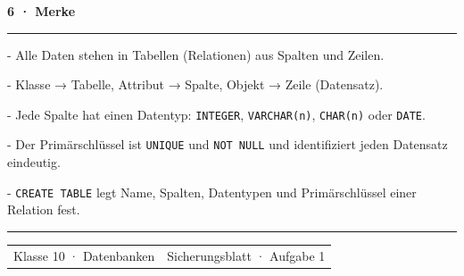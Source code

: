 \documentclass[10pt,a4paper]{article}
\newcommand{\sectiontitle}[1]{%
  \vspace{2.3mm}
  {\color{Blue}\bfseries\large #1}\par
  \vspace{0.8mm}
  {\color{Blue}\rule{\linewidth}{0.7pt}}\par
  \vspace{1.2mm}
}
\begin{document}
\sectiontitle{6 · Merke}

\begin{tcolorbox}[colback=white,colframe=Line,arc=3mm,boxrule=0.7pt,left=3mm,right=3mm,top=2mm,bottom=2mm]
  - Alle Daten stehen in Tabellen (Relationen) aus Spalten und Zeilen.\par
  - Klasse → Tabelle, Attribut → Spalte, Objekt → Zeile (Datensatz).\par
  - Jede Spalte hat einen Datentyp: \texttt{INTEGER}, \texttt{VARCHAR(n)},
  \texttt{CHAR(n)} oder \texttt{DATE}.\par
  - Der Primärschlüssel ist \texttt{UNIQUE} und \texttt{NOT NULL} und
  identifiziert jeden Datensatz eindeutig.\par
  - \texttt{CREATE TABLE} legt Name, Spalten, Datentypen und Primärschlüssel
  einer Relation fest.
\end{tcolorbox}

\vfill
{\color{Line}\rule{\linewidth}{0.5pt}}\par
\vspace{1.5mm}
\begin{tabularx}{\linewidth}{@{}Xr@{}}
  {\small\color{Muted}Klasse 10 · Datenbanken} &
  {\small\color{Muted}Sicherungsblatt · Aufgabe 1}
\end{tabularx}
\end{document}

